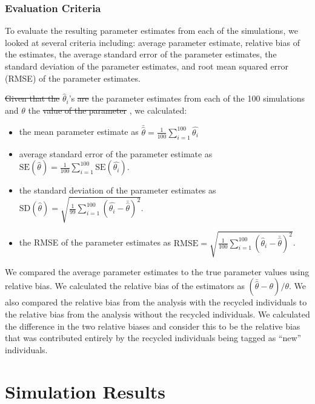 \documentclass[12pt]{article}
\providecommand{\tightlist}{%
  \setlength{\itemsep}{0pt}\setlength{\parskip}{0pt}}
\providecommand{\DIFaddtex}[1]{{\protect\color{blue}\uwave{#1}}} %
\providecommand{\DIFdeltex}[1]{{\protect\color{red}\sout{#1}}}                      %
\providecommand{\DIFaddbegin}{} %
\providecommand{\DIFaddend}{} %
\providecommand{\DIFdelbegin}{} %
\providecommand{\DIFdelend}{} %
\providecommand{\DIFadd}[1]{\texorpdfstring{\DIFaddtex{#1}}{#1}} %
\providecommand{\DIFdel}[1]{\texorpdfstring{\DIFdeltex{#1}}{}} %
\newcommand{\DIFscaledelfig}{0.5}
\newlength{\DIFdelgraphicswidth} %
\newlength{\DIFdelgraphicsheight} %
\newcommand{\DIFaddincludegraphics}[2][]{{\color{blue}\fbox{\DIFOincludegraphics[#1]{#2}}}} %
\newcommand{\DIFdelincludegraphics}[2][]{%
\sbox{\DIFdelgraphicsbox}{\DIFOincludegraphics[#1]{#2}}%
\settoboxwidth{\DIFdelgraphicswidth}{\DIFdelgraphicsbox} %
\settoboxtotalheight{\DIFdelgraphicsheight}{\DIFdelgraphicsbox} %
\scalebox{\DIFscaledelfig}{%
\parbox[b]{\DIFdelgraphicswidth}{\usebox{\DIFdelgraphicsbox}\\[-\baselineskip] \rule{\DIFdelgraphicswidth}{0em}}\llap{\resizebox{\DIFdelgraphicswidth}{\DIFdelgraphicsheight}{%
\setlength{\unitlength}{\DIFdelgraphicswidth}%
\begin{picture}(1,1)%
\thicklines\linethickness{2pt} %
{\color[rgb]{1,0,0}\put(0,0){\framebox(1,1){}}}%
{\color[rgb]{1,0,0}\put(0,0){\line( 1,1){1}}}%
{\color[rgb]{1,0,0}\put(0,1){\line(1,-1){1}}}%
\end{picture}%
}\hspace*{3pt}}} %
} %
\DeclareRobustCommand{\DIFaddbegin}{\DIFOaddbegin \let\includegraphics\DIFaddincludegraphics} %
\DeclareRobustCommand{\DIFaddend}{\DIFOaddend \let\includegraphics\DIFOincludegraphics} %
\DeclareRobustCommand{\DIFdelbegin}{\DIFOdelbegin \let\includegraphics\DIFdelincludegraphics} %
\DeclareRobustCommand{\DIFdelend}{\DIFOaddend \let\includegraphics\DIFOincludegraphics} %
\begin{document}
\subsubsection{Evaluation Criteria}\label{evaluation-criteria}

To evaluate the resulting parameter estimates from each of the simulations, we looked at several criteria including: average parameter
estimate, relative bias of the estimates, the average standard error of
the parameter estimates, the standard deviation of the parameter
estimates, and root mean squared error (RMSE) of the parameter
estimates.

\DIFdelbegin \DIFdel{Given that the }\DIFdelend \DIFaddbegin \DIFadd{Let }\DIFaddend \(\hat{\theta}_i\)'s \DIFdelbegin \DIFdel{are }\DIFdelend \DIFaddbegin \DIFadd{be }\DIFaddend the parameter estimates from each of
the 100 simulations and $\theta$ the \DIFdelbegin \DIFdel{value of the parameter }\DIFdelend \DIFaddbegin \DIFadd{true parameter value}\DIFaddend , we calculated:

\begin{itemize}
\tightlist
\item
  the mean parameter estimate as
  \(\bar{\hat{\theta}}= \frac{1}{100} \sum_{i=1}^{100} \hat{\theta_i}\)
\item
  average standard error of the parameter estimate as
  \(\text{SE}(\hat{\theta})= \frac{1}{100} \sum_{i=1}^{100} \text{SE}(\hat{\theta_i})\).
\item
  the standard deviation of the parameter estimates as
  \(\text{SD}(\hat{\theta})= \sqrt{\frac{1}{99} \sum_{i=1}^{100} (\hat{\theta_i}-\bar{\hat{\theta}})^2}\).
\item
  the RMSE of the parameter estimates as
  \(\text{RMSE}= \sqrt{\frac{1}{100} \sum_{i=1}^{100} (\hat{\theta}_i-\bar{\hat{\theta}})^2} \).
\end{itemize}

We compared the average parameter estimates  to the true parameter
values using relative bias. We calculated the relative bias of the
estimators as \((\bar{\hat{\theta}} -\theta)/\theta\). We also
compared the relative bias from the analysis with the recycled
individuals to the relative bias from the analysis without the recycled
individuals. We calculated the difference in the two relative biases and
consider this to be the relative bias that was contributed entirely by the
recycled individuals being tagged as ``new'' individuals.




\section{Simulation Results}\label{results}
\end{document}
